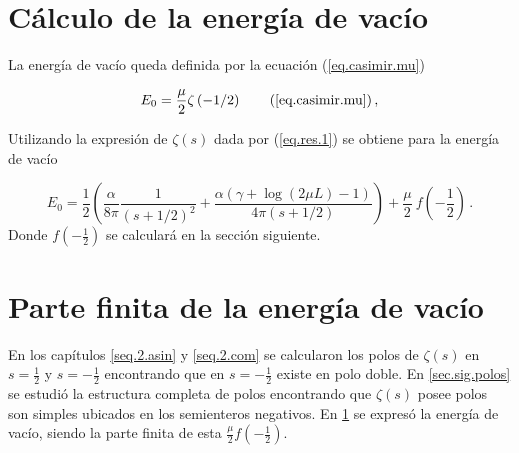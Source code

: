 \begin{comment}
\begin{equation}
\frac{1 }{2 \pi i}
\int _{circulo} \lambda ^{-2s } \partial \lambda \ Ln \left[
					\frac{e ^{\frac{i \alpha  \log ( 2 \lambda L )}{2 \lambda}} e ^{2 i \lambda L} S1}
					{\Gamma \left( 1 - \frac{i \alpha}{2 \lambda} \right)} - 
					\frac{e ^{\frac{-i \alpha  \log (2 \lambda L )}{2 \lambda}} S2}
					{\Gamma \left( 1 + \frac{i \alpha}{2 \lambda} \right)}					
					\right] d \lambda
\end{equation}
\end{comment}


\section{Cálculo de la energía de vacío}
\label{sec.regular}

La energía de vacío queda definida por la ecuación (\ref{eq.casimir.mu})

\begin{equation}
    E _0 = \frac{\mu }{2}  
    \zeta  \left( - 1/2 \right) 
    \tag{\ref{eq.casimir.mu}} \, ,
\end{equation}

Utilizando la expresión de $\zeta  (s )$ dada por (\ref{eq.res.1}) se obtiene para la energía de vacío

\begin{equation}\label{eq.casimir.resultado}
E _0 = \frac{1}{2} \left(
				\frac{\alpha}{8 \pi  } \frac{1}{(s+1/2)^2} + 
				\frac{\alpha ( \gamma  +  \log (2\mu L ) -1 )}{4 \pi  (s+1/2)}
				\right) + 
				\frac{\mu}{2} \ f \left( - \frac{1}{2} \right)
\, .
\end{equation}
Donde $f \left( - \frac{1}{2}\right)$ se calculará en la sección siguiente.


\section{Parte finita de la energía de vacío}

En los capítulos \ref{seq.2.asin} y \ref{seq.2.com} se calcularon los polos de \mbox{$\zeta (s)$} en $s= \frac{1}{2}$ y $s=-\frac{1}{2}$ encontrando que en $s=- \frac{1}{2}$ existe en polo doble. En \ref{sec.sig.polos} se estudió la estructura completa de polos encontrando que $\zeta (s)$ posee polos son simples ubicados en los semienteros negativos. En \ref{sec.regular} se expresó la energía de vacío, siendo la parte finita de esta $\frac{\mu}{2} f \left( - \frac{1}{2} \right)$. 


